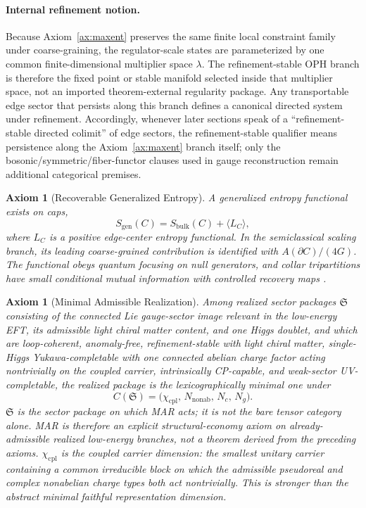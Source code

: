 \documentclass[11pt]{article}
\newtheorem{axiom}[theorem]{Axiom}
\begin{document}
\paragraph{Internal refinement notion.}
Because Axiom~\ref{ax:maxent} preserves the same finite local constraint family under coarse-graining, the regulator-scale states are parameterized by one common finite-dimensional multiplier space \(\lambda\). The refinement-stable OPH branch is therefore the fixed point or stable manifold selected inside that multiplier space, not an imported theorem-external regularity package. Any transportable edge sector that persists along this branch defines a canonical directed system under refinement. Accordingly, whenever later sections speak of a ``refinement-stable directed colimit'' of edge sectors, the refinement-stable qualifier means persistence along the Axiom~\ref{ax:maxent} branch itself; only the bosonic/symmetric/fiber-functor clauses used in gauge reconstruction remain additional categorical premises.

\begin{axiom}[Recoverable Generalized Entropy]\label{ax:entropy}
A generalized entropy functional exists on caps,
\[
S_{\mathrm{gen}}(C)=S_{\mathrm{bulk}}(C)+\langle L_C\rangle,
\]
where \(L_C\) is a positive edge-center entropy functional. In the semiclassical scaling branch, its leading coarse-grained contribution is identified with \(A(\partial C)/(4G)\). The functional obeys quantum focusing on null generators, and collar tripartitions have small conditional mutual information with controlled recovery maps \cite{LiebRuskai,Petz86,Petz88,FawziRenner}.
\end{axiom}

\begin{axiom}[Minimal Admissible Realization]\label{ax:mar}
Among realized sector packages \(\mathfrak S\) consisting of the connected Lie gauge-sector image relevant in the low-energy EFT, its admissible light chiral matter content, and one Higgs doublet, and which are loop-coherent, anomaly-free, refinement-stable with light chiral matter, single-Higgs Yukawa-completable with one connected abelian charge factor acting nontrivially on the coupled carrier, intrinsically CP-capable, and weak-sector UV-completable, the realized package is the lexicographically minimal one under
\[
C(\mathfrak S)=\bigl(\chi_{\mathrm{cpl}},\,N_{\mathrm{nonab}},\,N_c,\,N_g\bigr).
\]
\(\mathfrak S\) is the sector package on which MAR acts; it is not the bare tensor category alone. MAR is therefore an explicit structural-economy axiom on already-admissible realized low-energy branches, not a theorem derived from the preceding axioms. \(\chi_{\mathrm{cpl}}\) is the coupled carrier dimension: the smallest unitary carrier containing a common irreducible block on which the admissible pseudoreal and complex nonabelian charge types both act nontrivially. This is stronger than the abstract minimal faithful representation dimension.
\end{axiom}
\end{document}
